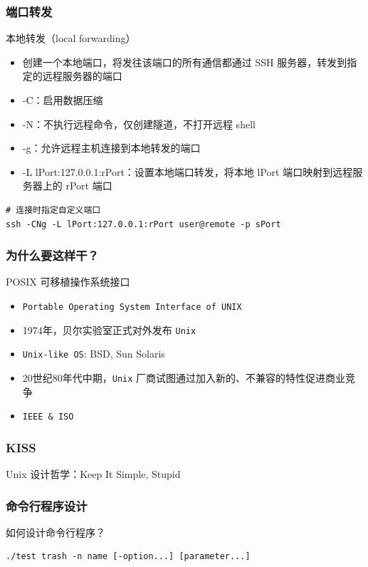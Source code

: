 \documentclass[UTF8, 16pt]{beamer}
\begin{document}
\begin{frame}[fragile]
    \frametitle{端口转发}
    \textcolor{sufered}{本地转发（local forwarding）}
    \begin{itemize}
        \item 创建一个本地端口，将发往该端口的所有通信都通过 SSH 服务器，转发到指定的远程服务器的端口
        \item -C：启用数据压缩
        \item -N：不执行远程命令，仅创建隧道，不打开远程 shell
        \item -g：允许远程主机连接到本地转发的端口
        \item -L lPort:127.0.0.1:rPort：设置本地端口转发，将本地 lPort 端口映射到远程服务器上的 rPort 端口
    \end{itemize}

    \begin{lstlisting}
# 连接时指定自定义端口
ssh -CNg -L lPort:127.0.0.1:rPort user@remote -p sPort
    \end{lstlisting}
\end{frame}

\begin{frame}[fragile]
    \frametitle{为什么要这样干？}

    \textcolor{sufered}{POSIX 可移植操作系统接口}

    \begin{itemize}
        \item \texttt{Portable Operating System Interface of UNIX}
        \item 1974年，贝尔实验室正式对外发布 \texttt{Unix}
        \item \texttt{Unix-like OS}: BSD, Sun Solaris
        \item 20世纪80年代中期，\texttt{Unix} 厂商试图通过加入新的、不兼容的特性促进商业竞争
        \item \texttt{IEEE \& ISO}
    \end{itemize}
\end{frame}

\begin{frame}
    \frametitle{KISS}

    \textcolor{sufered}{Unix 设计哲学：Keep It Simple, Stupid}
\end{frame}

\begin{frame}[fragile]
    \frametitle{命令行程序设计}
    \textcolor{sufered}{如何设计命令行程序？}
    \begin{lstlisting}[numbers=none]
./test trash -n name [-option...] [parameter...]
    \end{lstlisting}
\end{frame}
\end{document}
